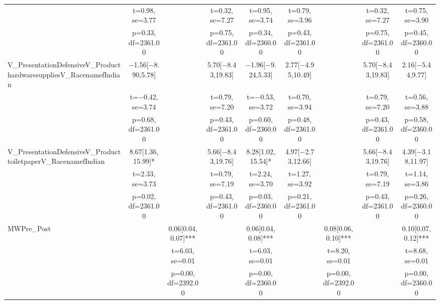 \documentclass[]{report}
\begin{document}
\begin{table}
{\begin{tabular}[t]{lcccccccc}
		& t=\num{0.98}, se=\num{3.77} &  & t=\num{0.32}, se=\num{7.27} & t=\num{0.95}, se=\num{3.74} & t=\num{0.79}, se=\num{3.96} &  & t=\num{0.32}, se=\num{7.27} & t=\num{0.75}, se=\num{3.90}\\
		& p=\num{0.33}, df=\num{2361.00} &  & p=\num{0.75}, df=\num{2361.00} & p=\num{0.34}, df=\num{2360.00} & p=\num{0.43}, df=\num{2361.00} &  & p=\num{0.75}, df=\num{2361.00} & p=\num{0.45}, df=\num{2360.00}\\
		V\_PresentationDefensiveV\_ProducthardwaresuppliesV\_RacenamefIndian & \num{-1.56}[\num{-8.90},\num{5.78}] &  & \num{5.70}[\num{-8.43},\num{19.83}] & \num{-1.96}[\num{-9.24},\num{5.33}] & \num{2.77}[\num{-4.95},\num{10.49}] &  & \num{5.70}[\num{-8.43},\num{19.83}] & \num{2.16}[\num{-5.44},\num{9.77}]\\
		& t=\num{-0.42}, se=\num{3.74} &  & t=\num{0.79}, se=\num{7.20} & t=\num{-0.53}, se=\num{3.72} & t=\num{0.70}, se=\num{3.94} &  & t=\num{0.79}, se=\num{7.20} & t=\num{0.56}, se=\num{3.88}\\
		& p=\num{0.68}, df=\num{2361.00} &  & p=\num{0.43}, df=\num{2361.00} & p=\num{0.60}, df=\num{2360.00} & p=\num{0.48}, df=\num{2361.00} &  & p=\num{0.43}, df=\num{2361.00} & p=\num{0.58}, df=\num{2360.00}\\
		V\_PresentationDefensiveV\_ProducttoiletpaperV\_RacenamefIndian & \num{8.67}[\num{1.36},\num{15.99}]* &  & \num{5.66}[\num{-8.43},\num{19.76}] & \num{8.28}[\num{1.02},\num{15.54}]* & \num{4.97}[\num{-2.73},\num{12.66}] &  & \num{5.66}[\num{-8.43},\num{19.76}] & \num{4.39}[\num{-3.18},\num{11.97}]\\
		& t=\num{2.33}, se=\num{3.73} &  & t=\num{0.79}, se=\num{7.19} & t=\num{2.24}, se=\num{3.70} & t=\num{1.27}, se=\num{3.92} &  & t=\num{0.79}, se=\num{7.19} & t=\num{1.14}, se=\num{3.86}\\
		& p=\num{0.02}, df=\num{2361.00} &  & p=\num{0.43}, df=\num{2361.00} & p=\num{0.03}, df=\num{2360.00} & p=\num{0.21}, df=\num{2361.00} &  & p=\num{0.43}, df=\num{2361.00} & p=\num{0.26}, df=\num{2360.00}\\
		MWPre\_Post &  & \num{0.06}[\num{0.04},\num{0.07}]*** &  & \num{0.06}[\num{0.04},\num{0.08}]*** &  & \num{0.08}[\num{0.06},\num{0.10}]*** &  & \num{0.10}[\num{0.07},\num{0.12}]***\\
		&  & t=\num{6.03}, se=\num{0.01} &  & t=\num{6.03}, se=\num{0.01} &  & t=\num{8.20}, se=\num{0.01} &  & t=\num{8.68}, se=\num{0.01}\\
		&  & p=\num{0.00}, df=\num{2392.00} &  & p=\num{0.00}, df=\num{2360.00} &  & p=\num{0.00}, df=\num{2392.00} &  & p=\num{0.00}, df=\num{2360.00}\\

\end{tabular}}
\end{table}
\end{document}
